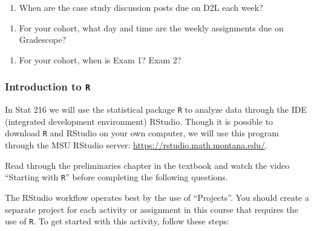 \documentclass[
]{report}
\providecommand{\tightlist}{%
  \setlength{\itemsep}{0pt}\setlength{\parskip}{0pt}}
\begin{document}
\begin{enumerate}
\def\labelenumi{\arabic{enumi}.}
\tightlist
\item
  When are the case study discussion posts due on D2L each week?
\end{enumerate}

\vspace{0.3in}

\begin{enumerate}
\def\labelenumi{\arabic{enumi}.}
\setcounter{enumi}{1}
\tightlist
\item
  For your cohort, what day and time are the weekly assignments due on Gradescope?
\end{enumerate}

\vspace{0.3in}

\begin{enumerate}
\def\labelenumi{\arabic{enumi}.}
\setcounter{enumi}{2}
\tightlist
\item
  For your cohort, when is Exam 1? Exam 2?
\end{enumerate}

\vspace{0.3in}

\hypertarget{introduction-to-r}{%
\subsubsection{\texorpdfstring{Introduction to \texttt{R}}{Introduction to R}}\label{introduction-to-r}}

In Stat 216 we will use the statistical package \texttt{R} to analyze data through the IDE (integrated development environment) RStudio. Though it is possible to download \texttt{R} and RStudio on your own computer, we will use this program through the MSU RStudio server: \url{https://rstudio.math.montana.edu/}.

Read through the preliminaries chapter in the textbook and watch the video ``Starting with \texttt{R}'' before completing the following questions.

The RStudio workflow operates best by the use of ``Projects''. You should create a separate project for each activity or assignment in this course that requires the use of \texttt{R}. To get started with this activity, follow these steps:
\end{document}
